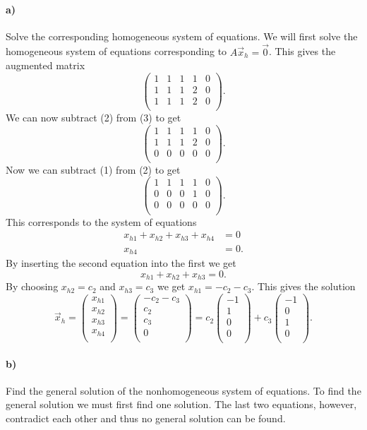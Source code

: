\paragraph{a)} Solve the corresponding homogeneous system of equations.
\bigbreak
We will first solve the homogeneous system of equations corresponding to $A \Vec{x}_h = \Vec{0}$. This gives the augmented matrix
\[ 
\left( \begin{array}{cccc|c}
1 & 1 & 1 & 1 & 0\\
1 & 1 & 1 & 2 & 0\\
1 & 1 & 1 & 2 & 0\\
\end{array} \right)
.\]
We can now subtract (2) from (3) to get
\[ 
\left( \begin{array}{cccc|c}
1 & 1 & 1 & 1 & 0\\
1 & 1 & 1 & 2 & 0\\
0 & 0 & 0 & 0 & 0\\
\end{array} \right)
.\]
Now we can subtract (1) from (2) to get
\[ 
\left( \begin{array}{cccc|c}
1 & 1 & 1 & 1 & 0\\
0 & 0 & 0 & 1 & 0\\
0 & 0 & 0 & 0 & 0\\
\end{array} \right)
.\]
This corresponds to the system of equations
\begin{align*}
  x_{h1} + x_{h2} + x_{h3} + x_{h4} &= 0 \\
  x_{h4} &= 0
.\end{align*}
By inserting the second equation into the first we get
\[ 
x_{h1} + x_{h2} + x_{h3} = 0
.\]
By choosing $x_{h2} = c_2$ and $x_{h3} = c_3$ we get $x_{h1} = -c_2 - c_3$. This gives the solution
\[ 
\Vec{x}_h = \begin{pmatrix}
x_{h1}\\
x_{h2}\\
x_{h3}\\
x_{h4}\\
\end{pmatrix} = \begin{pmatrix}
-c_2 - c_3\\
c_2\\
c_3\\
0\\
\end{pmatrix} = c_2 \begin{pmatrix}
-1\\
1\\
0\\
0\\
\end{pmatrix} + c_3 \begin{pmatrix}
-1\\
0\\
1\\
0\\
\end{pmatrix}
.\]



\paragraph{b)} Find the general solution of the nonhomogeneous system of equations.
\bigbreak
To find the general solution we must first find one solution. The last two equations, however, contradict each other and thus no general solution can be found.
